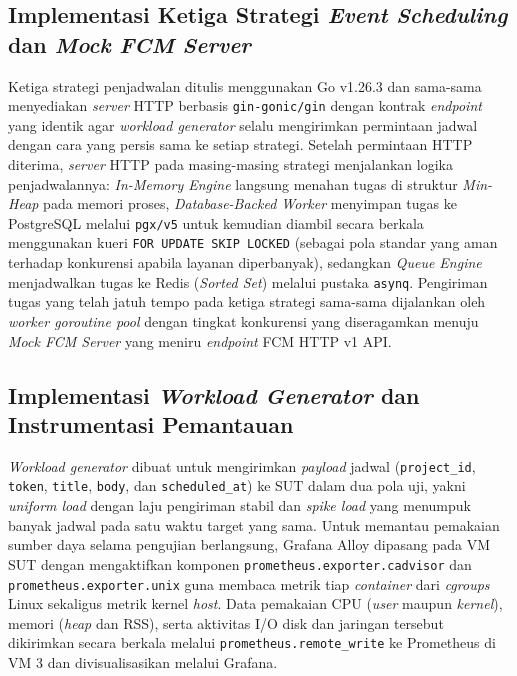 \subsection{Implementasi Ketiga Strategi \textit{Event Scheduling} dan \textit{Mock FCM Server}} \label{III.Langkah 3}
Ketiga strategi penjadwalan ditulis menggunakan Go v1.26.3 dan sama-sama menyediakan \textit{server} HTTP berbasis \texttt{gin-gonic/gin} dengan kontrak \textit{endpoint} yang identik agar \textit{workload generator} selalu mengirimkan permintaan jadwal dengan cara yang persis sama ke setiap strategi. Setelah permintaan HTTP diterima, \textit{server} HTTP pada masing-masing strategi menjalankan logika penjadwalannya: \textit{In-Memory Engine} langsung menahan tugas di struktur \textit{Min-Heap} pada memori proses, \textit{Database-Backed Worker} menyimpan tugas ke PostgreSQL melalui \texttt{pgx/v5} untuk kemudian diambil secara berkala menggunakan kueri \texttt{FOR UPDATE SKIP LOCKED} (sebagai pola standar yang aman terhadap konkurensi apabila layanan diperbanyak), sedangkan \textit{Queue Engine} menjadwalkan tugas ke Redis (\textit{Sorted Set}) melalui pustaka \texttt{asynq}. Pengiriman tugas yang telah jatuh tempo pada ketiga strategi sama-sama dijalankan oleh \textit{worker goroutine pool} dengan tingkat konkurensi yang diseragamkan menuju \textit{Mock FCM Server} yang meniru \textit{endpoint} FCM HTTP v1 API. \par

\subsection{Implementasi \textit{Workload Generator} dan Instrumentasi Pemantauan} \label{III.Langkah 4}
\textit{Workload generator} dibuat untuk mengirimkan \textit{payload} jadwal (\texttt{project\_id}, \texttt{token}, \texttt{title}, \texttt{body}, dan \texttt{scheduled\_at}) ke SUT dalam dua pola uji, yakni \textit{uniform load} dengan laju pengiriman stabil dan \textit{spike load} yang menumpuk banyak jadwal pada satu waktu target yang sama. Untuk memantau pemakaian sumber daya selama pengujian berlangsung, Grafana Alloy dipasang pada VM SUT dengan mengaktifkan komponen \texttt{prometheus.exporter.cadvisor} dan \texttt{prometheus.exporter.unix} guna membaca metrik tiap \textit{container} dari \textit{cgroups} Linux sekaligus metrik kernel \textit{host}. Data pemakaian CPU (\textit{user} maupun \textit{kernel}), memori (\textit{heap} dan RSS), serta aktivitas I/O disk dan jaringan tersebut dikirimkan secara berkala melalui \texttt{prometheus.remote\_write} ke Prometheus di VM 3 dan divisualisasikan melalui Grafana. \par

